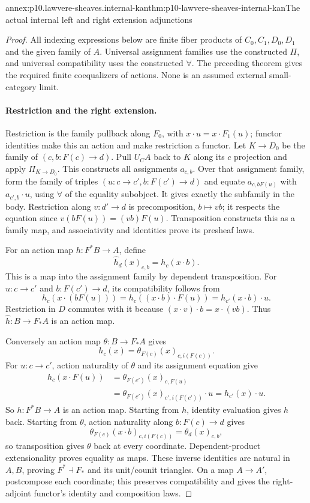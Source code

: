 \begin{annexitem}{annex:p10.lawvere-sheaves.internal-kan}{thm:p10-lawvere-sheaves-internal-kan}{The actual internal left and right extension adjunctions}
\begin{proof}
All indexing expressions below are finite fiber products of
\(C_0,C_1,D_0,D_1\) and the given family of \(A\).
Universal assignment families use the constructed \(\Pi\),
and universal compatibility uses the constructed \(\forall\).
The preceding theorem gives the required finite coequalizers
of actions.  None is an assumed external small-category limit.

\paragraph{Restriction and the right extension.}
Restriction is the family pullback along \(F_0\), with
\(x\cdot u=x\cdot F_1(u)\); functor identities make
this an action and make restriction a functor.
Let \(K\to D_0\) be the family of
\((c,b:F(c)\to d)\).  Pull \(U_CA\) back to \(K\)
along its \(c\) projection and apply \(\Pi_{K\to D_0}\).
This constructs all assignments \(a_{c,b}\).
Over that assignment family, form the family of triples
\((u:c\to c',b:F(c')\to d)\) and equate
\(a_{c,bF(u)}\) with \(a_{c',b}\cdot u\), using
\(\forall\) of the equality subobject.  It gives exactly
the subfamily in the body.  Restriction along
\(v:d'\to d\) is precomposition, \(b\mapsto vb\);
it respects the equation since \(v(bF(u))=(vb)F(u)\).
Transposition constructs this as a family map, and
associativity and identities prove its presheaf laws.

For an action map \(h:F^*B\to A\), define
\[
 \widehat h_d(x)_{c,b}=h_c(x\cdot b).
\]
This is a map into the assignment family by dependent
transposition.  For \(u:c\to c'\) and \(b:F(c')\to d\),
its compatibility follows from
\[
 h_c(x\cdot(bF(u)))
   =h_c((x\cdot b)\cdot F(u))
   =h_{c'}(x\cdot b)\cdot u.
\]
Restriction in \(D\) commutes with it because
\((x\cdot v)\cdot b=x\cdot(vb)\).
Thus \(\widehat h:B\to F_*A\) is an action map.

Conversely an action map \(\theta:B\to F_*A\) gives
\[
              h_c(x)=\theta_{F(c)}(x)_{c,i(F(c))}.
\]
For \(u:c\to c'\), action naturality of \(\theta\)
and its assignment equation give
\[
\begin{aligned}
 h_c(x\cdot F(u))
  &=\theta_{F(c')}(x)_{c,F(u)}\\
  &=\theta_{F(c')}(x)_{c',i(F(c'))}\cdot u
    =h_{c'}(x)\cdot u.
\end{aligned}
\]
So \(h:F^*B\to A\) is an action map.  Starting from
\(h\), identity evaluation gives \(h\) back.  Starting
from \(\theta\), action naturality along
\(b:F(c)\to d\) gives
\[
 \theta_{F(c)}(x\cdot b)_{c,i(F(c))}
                              =\theta_d(x)_{c,b},
\]
so transposition gives \(\theta\) back at every coordinate.
Dependent-product extensionality proves equality as maps.
These inverse identities are natural in \(A,B\), proving
\(F^*\dashv F_*\) and its unit/counit triangles.
On a map \(A\to A'\), postcompose each coordinate;
this preserves compatibility and gives the right-adjoint
functor's identity and composition laws.


\end{proof}
\end{annexitem}
